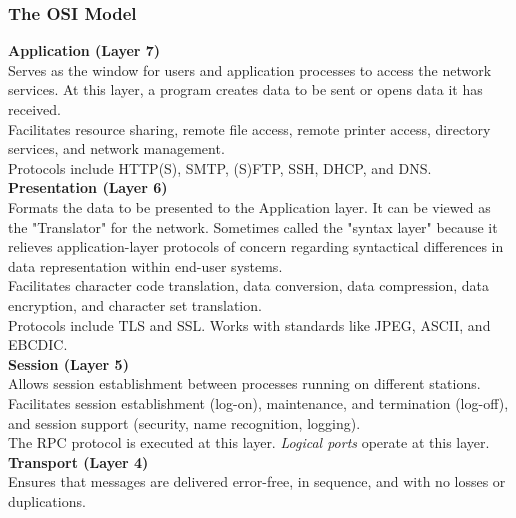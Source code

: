 \documentclass[12pt, titlepage]{article}
\begin{document}
\subsubsection{The OSI Model}

\textbf{Application (Layer 7)} \\

Serves as the window for users and application processes to access the network services. At this layer, a program creates data to be sent or opens data it has received. \\

Facilitates resource sharing, remote file access, remote printer access, directory services, and network management. \\

Protocols include HTTP(S), SMTP, (S)FTP, SSH, DHCP, and DNS. \\

\textbf{Presentation (Layer 6)} \\

Formats the data to be presented to the Application layer. It can be viewed as the "Translator" for the network. Sometimes called the "syntax layer" because it relieves application-layer protocols of concern regarding syntactical differences in data representation within end-user systems. \\

Facilitates character code translation, data conversion, data compression, data encryption, and character set translation. \\

Protocols include TLS and SSL. Works with standards like JPEG, ASCII, and EBCDIC. \\

\textbf{Session (Layer 5)} \\

Allows session establishment between processes running on different stations. \\

Facilitates session establishment (log-on), maintenance, and termination (log-off), and session support (security, name recognition, logging). \\

The RPC protocol is executed at this layer. \textit{Logical ports} operate at this layer. \\

\textbf{Transport (Layer 4)} \\

Ensures that messages are delivered error-free, in sequence, and with no losses or duplications. \\
\end{document}
